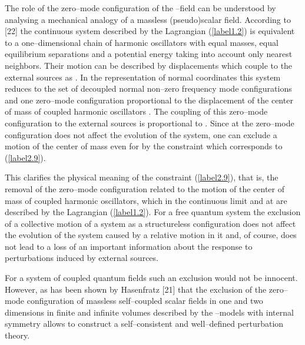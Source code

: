 \documentclass[a4paper,12pt] {article}
\begin{document}
The role of the zero--mode configuration of the \myHighlight{$\vartheta$}\coordHE{}--field can
be understood by analysing a mechanical analogy of a massless
(pseudo)scalar field. According to [22] the continuous system
described by the Lagrangian (\ref{label1.2}) is equivalent to a
one--dimensional chain of \coordHE{} harmonic oscillators with equal masses,
equal equilibrium separations and a potential energy taking into
account only nearest neighbors. Their motion can be described by
displacements \coordHE{} which couple to the external
sources as \coordHE{}. In the representation of normal
coordinates this system reduces to the set of \coordHE{} decoupled normal
non--zero frequency mode configurations and one zero--mode
configuration proportional to the displacement of the center of mass
of \coordHE{} coupled harmonic oscillators \coordHE{}. The
coupling of this zero--mode configuration to the external sources is
proportional to \coordHE{}. Since at \coordHE{} the zero--mode configuration does not affect the
evolution of the system, one can exclude a motion of the center of
mass even for \coordHE{} by the constraint
\coordHE{} which corresponds to (\ref{label2.9}).  

This clarifies the physical meaning of the constraint
(\ref{label2.9}), that is, the removal of the zero--mode configuration
related to the motion of the center of mass of \coordHE{} coupled harmonic
oscillators, which in the continuous limit and at \coordHE{} are
described by the Lagrangian (\ref{label1.2}).  For a free quantum
system the exclusion of a collective motion of a system as a
structureless configuration does not affect the evolution of the
system caused by a relative motion in it and, of course, does not lead
to a loss of an important information about the response to
perturbations induced by external sources.

For a system of coupled quantum fields such an exclusion would not be
innocent. However, as has been shown by Hasenfratz [21] that the
exclusion of the zero--mode configuration of massless self--coupled
scalar fields in one and two dimensions in finite and infinite volumes
described by the \myHighlight{$\sigma$}\coordHE{}--models with \coordHE{} internal symmetry allows
to construct a self--consistent and well--defined perturbation theory.
\end{document}
